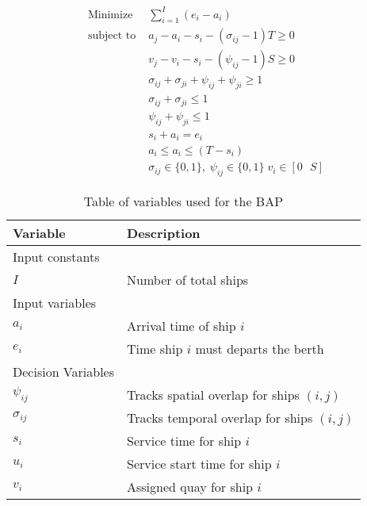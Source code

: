 \documentclass[11pt,a4paper,final]{article}
\begin{document}
\begin{subequations}
\label{eq:generalbap}
\label{eq:bapconstrs}
\begin{align}
    \text{Minimize }   & \sum_{i=1}^I (e_i - a_i)                                       \label{subeq:bapobj}    \\
    \text{subject to } &a_j - a_i - s_i - (\sigma_{ij} - 1)T \geq 0                         \label{subeq:baptemporal}         \\
                       &v_j - v_i - s_i - (\psi_{ij} - 1)S \geq 0                         \label{subeq:bapspatial}        \\
                       &\sigma_{ij} + \sigma_{ji} + \psi_{ij} + \psi_{ji} \geq 1                       \label{subeq:bapvalidpos}    \\
                       &\sigma_{ij} + \sigma_{ji} \leq 1                                         \label{subeq:bapsigma}        \\
                       &\psi_{ij} + \psi_{ji} \leq 1                                         \label{subeq:bappsi}        \\
                       &s_i + a_i = e_i                                             \label{subeq:bapdetach}       \\
                       &a_i \leq a_i \leq (T - s_i)                                       \label{subeq:bapvalidtime} \\
                       &\sigma_{ij} \in \{0,1\},\;\psi_{ij} \in \{0,1\}\; v_i \in [0 \mbox{ } S ] \label{subeq:bapspaces}
\end{align}
\end{subequations}

\begin{table}[htbp]
\caption{\label{tab:bapvariables}Table of variables used for the BAP}
\centering
\begin{tabular}{ll}
\textbf{Variable} & \textbf{Description}\\[0pt]
\hline
Input constants & \\[0pt]
\(I\) & Number of total ships\\[0pt]
\hline
Input variables & \\[0pt]
\(a_i\) & Arrival time of ship \(i\)\\[0pt]
\(e_i\) & Time ship \(i\) must departs the berth\\[0pt]
\hline
Decision Variables & \\[0pt]
\(\psi_{ij}\) & Tracks spatial overlap for ships \((i,j)\)\\[0pt]
\(\sigma_{ij}\) & Tracks temporal overlap for ships \((i,j)\)\\[0pt]
\(s_i\) & Service time for ship \(i\)\\[0pt]
\(u_i\) & Service start time for ship \(i\)\\[0pt]
\(v_i\) & Assigned quay for ship \(i\)\\[0pt]
\hline
\end{tabular}
\end{table}
\end{document}
